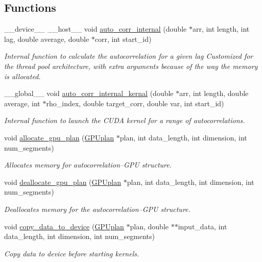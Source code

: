 \subsection*{Functions}
\begin{DoxyCompactItemize}
\item 
\+\_\+\+\_\+device\+\_\+\+\_\+ \+\_\+\+\_\+host\+\_\+\+\_\+ void \hyperlink{autocorrelation__cuda_8hu_a366f884938ea0477409e8d52f0309a44}{auto\+\_\+corr\+\_\+internal} (double $\ast$arr, int length, int lag, double average, double $\ast$corr, int start\+\_\+id)
\begin{DoxyCompactList}\small\item\em Internal function to calculate the autocorrelation for a given lag Customized for the thread pool architecture, with extra arguments because of the way the memory is allocated. \end{DoxyCompactList}\item 
\+\_\+\+\_\+global\+\_\+\+\_\+ void \hyperlink{autocorrelation__cuda_8hu_ad8cff0e627281b397e017fec619b38a5}{auto\+\_\+corr\+\_\+internal\+\_\+kernal} (double $\ast$arr, int length, double average, int $\ast$rho\+\_\+index, double target\+\_\+corr, double var, int start\+\_\+id)
\begin{DoxyCompactList}\small\item\em Internal function to launch the C\+U\+DA kernel for a range of autocorrelations. \end{DoxyCompactList}\item 
void \hyperlink{autocorrelation__cuda_8hu_a0516461a0e02bf12da6c199061247a77}{allocate\+\_\+gpu\+\_\+plan} (\hyperlink{structGPUplan}{G\+P\+Uplan} $\ast$plan, int data\+\_\+length, int dimension, int num\+\_\+segments)
\begin{DoxyCompactList}\small\item\em Allocates memory for autocorrelation--G\+PU structure. \end{DoxyCompactList}\item 
void \hyperlink{autocorrelation__cuda_8hu_a131867ca45185be0af927a5ec7d7645d}{deallocate\+\_\+gpu\+\_\+plan} (\hyperlink{structGPUplan}{G\+P\+Uplan} $\ast$plan, int data\+\_\+length, int dimension, int num\+\_\+segments)
\begin{DoxyCompactList}\small\item\em Deallocates memory for the autocorrelation--G\+PU structure. \end{DoxyCompactList}\item 
void \hyperlink{autocorrelation__cuda_8hu_a00159a0e9eb7e40725a034becb3110c0}{copy\+\_\+data\+\_\+to\+\_\+device} (\hyperlink{structGPUplan}{G\+P\+Uplan} $\ast$plan, double $\ast$$\ast$input\+\_\+data, int data\+\_\+length, int dimension, int num\+\_\+segments)
\begin{DoxyCompactList}\small\item\em Copy data to device before starting kernels. \end{DoxyCompactList}\end{DoxyCompactItemize}


